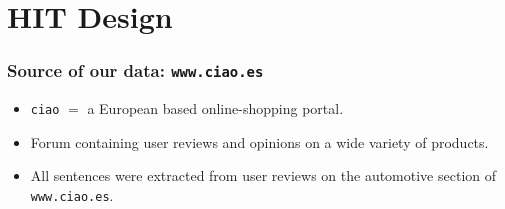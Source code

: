 \documentclass[10pt]{beamer}
\begin{document}
\section{HIT Design}

\begin{frame}
  \frametitle{Source of our data: \texttt{www.ciao.es}}

\begin{itemize}
 \item \texttt{ciao} $=$ a European based online-shopping portal.
 \item Forum containing user reviews and opinions on a wide variety of products.
 \item All sentences were extracted from user reviews on the automotive section of \texttt{www.ciao.es}.
\end{itemize}

  \begin{center}
  \end{center}

\end{frame}
\end{document}
